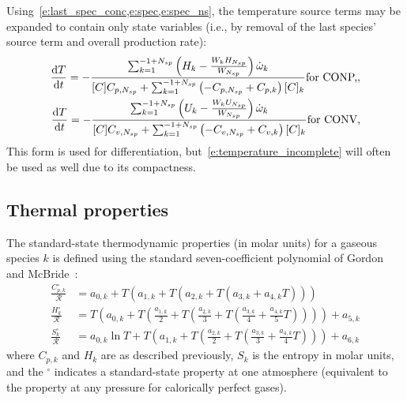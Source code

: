 \documentclass[12pt]{article}
\newcommand{\ns}{N_{sp}}
\newcommand{\conp}{CONP}
\newcommand{\conv}{CONV}
\newcommand{\dconp}{\ifmmode\text{for \conp,}\else for \conp,\fi}
\newcommand{\dconv}{\ifmmode\text{for \conv,}\else for \conv,\fi}
\begin{document}
Using~\cref{e:last_spec_conc,e:spec,e:spec_ns}, the temperature source terms may be expanded to contain only state variables (i.e., by removal of the last species' source term and overall production rate):
\begin{subequations}
\label{e:temperature_complete}
\begin{align}
\frac{\text{d} T }{\text{d} t } = - \frac{\sum_{k=1}^{-1 + \ns} \left(H_{k} - \frac{W_{k} H_{\ns}}{W_{\ns}}\right) \dot{\omega}_{k}}{[C] {C_{p,\ns}} + \sum_{k=1}^{-1 + \ns} \left(- {C_{p,\ns}} + {C_{p, k}}\right) [C]_{k}}\dconp,\\
\frac{\text{d} T }{\text{d} t } = - \frac{\sum_{k=1}^{-1 + \ns} \left(U_{k} - \frac{W_{k} U_{\ns}}{W_{\ns}}\right) \dot{\omega}_{k}}{[C] {C_{v,\ns}} + \sum_{k=1}^{-1 + \ns} \left(- {C_{v,\ns}} + {C_{v, k}}\right) [C]_{k}}\dconv
\end{align}
\end{subequations}
This form is used for differentiation, but~\cref{e:temperature_incomplete} will often be used as well due to its compactness.

\subsection{Thermal properties}
The standard-state thermodynamic properties (in molar units) for a gaseous species $k$ is defined using the standard seven-coefficient polynomial of Gordon and McBride~\cite{gordon1994computer}:
\begin{align}
\frac{C_{p,k}^{\circ}}{\mathcal{R}} &= a_{0,k} + T \left( a_{1,k} + T \left( a_{2,k} + T \left( a_{3,k} + a_{4,k} T \right) \right) \right) \label{e:cpk} \\
\frac{H_k^{\circ}}{\mathcal{R}} &= T \left( a_{0,k} + T \left( \frac{a_{1,k}}{2} + T \left( \frac{a_{2,k}}{3} + T \left( \frac{a_{3,k}}{4} + \frac{a_{4,k}}{5} T \right) \right) \right) \right) + a_{5,k} \label{e:hk} \\
\frac{S_k^{\circ}}{\mathcal{R}} &= a_{0,k} \ln T + T \left( a_{1,k} + T \left( \frac{a_{2,k}}{2} + T \left( \frac{a_{3,k}}{3} + \frac{a_{4,k}}{4} T \right) \right) \right) + a_{6,k} \label{e:sk}
\end{align}
where $C_{p,k}$ and $H_k$ are as described previously, $S_k$ is the entropy in molar units, and the ${}^{\circ}$ indicates a standard-state property at one atmosphere (equivalent to the property at any pressure for calorically perfect gases).
\end{document}

